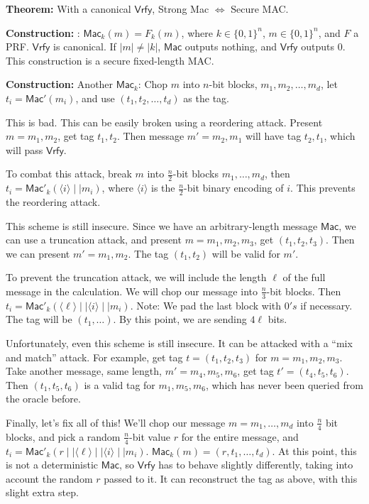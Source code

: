 \documentclass[12pt]{article}
\newcommand{\thm}[1]{{\bf Theorem:} \underline{#1}}
\newcommand{\con}[1]{{\bf Construction:} \underline{#1}}
\newcommand{\Mac}{\mathsf{Mac}}
\newcommand{\Vrfy}{\mathsf{Vrfy}}
\newcommand{\ang}[1]{\langle#1\rangle}
\begin{document}
\begin{multicols}{3}
\thm{} With a canonical $\Vrfy$, Strong Mac $\Leftrightarrow$ Secure MAC.

\con{}: $\Mac_k(m)=F_k(m)$, where $k\in\{0,1\}^n$, $m\in\{0,1\}^n$, and $F$ a PRF. $\Vrfy$ is canonical. If $|m|\neq|k|$, $\Mac$ outputs nothing, and $\Vrfy$ outputs $0$. This construction is a secure fixed-length MAC.

\con{} Another $\Mac_k$: Chop $m$ into $n$-bit blocks, $m_1,m_2,\dots,m_d$, let $t_i=\Mac'(m_i)$, and use $(t_1,t_2,\dots,t_d)$ as the tag.

This is bad. This can be easily broken using a reordering attack. Present $m=m_1,m_2$, get tag $t_1,t_2$. Then message $m'=m_2,m_1$ will have tag $t_2,t_1$, which will pass $\Vrfy$.

To combat this attack, break $m$ into $\frac{n}{2}$-bit blocks $m_1,\dots,m_d$, then $t_i=\Mac'_k(\ang{i}\mid\mid m_i)$, where $\ang{i}$ is the $\frac{n}{2}$-bit binary encoding of $i$. This prevents the reordering attack.

This scheme is still insecure. Since we have an arbitrary-length message $\Mac$, we can use a truncation attack, and present $m=m_1,m_2,m_3$, get $(t_1,t_2,t_3)$. Then we can present $m'=m_1,m_2$. The tag $(t_1,t_2)$ will be valid for $m'$.

To prevent the truncation attack, we will include the length $\ell$ of the full message in the calculation. We will chop our message into $\frac{n}{3}$-bit blocks. Then $t_i=\Mac'_k(\ang{\ell}\mid\mid\ang{i}\mid\mid m_i)$. Note: We pad the last block with $0's$ if necessary. The tag will be $(t_1,\dots)$. By this point, we are sending $4\ell$ bits.

Unfortunately, even this scheme is still insecure. It can be attacked with a ``mix and match'' attack. For example, get tag $t=(t_1,t_2,t_3)$ for $m=m_1,m_2,m_3$. Take another message, same length, $m'=m_4,m_5,m_6$, get tag $t'=(t_4,t_5,t_6)$. Then $(t_1,t_5,t_6)$ is a valid tag for $m_1,m_5,m_6$, which has never been queried from the oracle before.

Finally, let's fix all of this! We'll chop our message $m=m_1,\dots,m_d$ into $\frac{n}{4}$ bit blocks, and pick a random $\frac{n}{4}$-bit value $r$ for the entire message, and $t_i=\Mac'_k(r\mid\mid\ang{\ell}\mid\mid\ang{i}\mid\mid m_i)$. $\Mac_k(m)=(r,t_1,\dots,t_d)$. At this point, this is not a deterministic $\Mac$, so $\Vrfy$ has to behave slightly differently, taking into account the random $r$ passed to it. It can reconstruct the tag as above, with this slight extra step.


\end{multicols}
\end{document}

